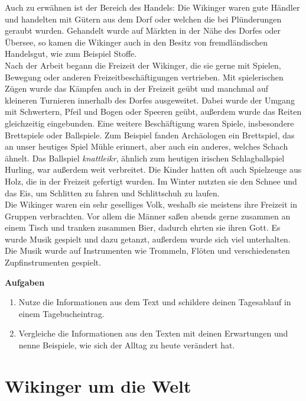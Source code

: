 \documentclass[12pt,a4paper,ngerman,openany]{book}
\newcommand{\aufgaben}[1]{
  \begin{tcolorbox}
    \textbf{Aufgaben}
    \begin{enumerate}
      #1
    \end{enumerate}
  \end{tcolorbox}
} %
\newcommand{\fchapter}[1]{\chapter{#1}\thispagestyle{chapterstyle}}
\begin{document}
Auch zu erwähnen ist der Bereich des Handels: Die Wikinger waren gute Händler und handelten mit Gütern aus dem Dorf oder welchen die bei Plünderungen geraubt wurden. Gehandelt wurde auf Märkten in der Nähe des Dorfes oder Übersee, so kamen die Wikinger auch in den Besitz von fremdländischen Handelsgut, wie zum Beispiel Stoffe.\\
Nach der Arbeit begann die Freizeit der Wikinger, die sie gerne mit Spielen, Bewegung oder anderen Freizeitbeschäftigungen vertrieben.
Mit spielerischen Zügen wurde das Kämpfen auch in der Freizeit geübt und manchmal auf kleineren Turnieren innerhalb des Dorfes ausgeweitet. Dabei wurde der Umgang mit Schwertern, Pfeil und Bogen oder Speeren geübt, außerdem wurde das Reiten gleichzeitig eingebunden. Eine weitere Beschäftigung waren Spiele, insbesondere Brettspiele oder Ballspiele. Zum Beispiel fanden Archäologen ein Brettspiel, das an unser heutiges Spiel \glqq Mühle\grqq{} erinnert, aber auch ein anderes, welches Schach ähnelt. Das Ballspiel \textit{knattleikr}, ähnlich zum heutigen irischen Schlagballspiel \glqq Hurling\grqq{}, war außerdem weit verbreitet. Die Kinder hatten oft auch Spielzeuge aus Holz, die in der Freizeit gefertigt wurden. Im Winter nutzten sie den Schnee und das Eis, um Schlitten zu fahren und Schlittschuh zu laufen.\\
Die Wikinger waren ein sehr geselliges Volk, weshalb sie meistens ihre Freizeit in Gruppen verbrachten.
Vor allem die Männer saßen abends gerne zusammen an einem Tisch und tranken zusammen Bier, dadurch ehrten sie ihren Gott. Es wurde Musik gespielt und dazu getanzt, außerdem wurde sich viel unterhalten. Die Musik wurde auf Instrumenten wie Trommeln, Flöten und verschiedensten Zupfinstrumenten gespielt.


\aufgaben{
  \item Nutze die Informationen aus dem Text und schildere deinen Tagesablauf in einem Tagebucheintrag.
  \item Vergleiche die Informationen aus den Texten mit deinen Erwartungen und nenne Beispiele, wie sich der Alltag zu heute verändert hat.
}

\fchapter{Wikinger um die Welt}
\end{document}
